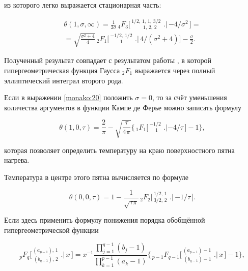 из  которого легко выражается стационарная часть:

\begin{multline*}

 \theta (1,\sigma,\infty)=\frac{1}{2\sigma}\,_{4}F_{3}\bigg[\,^{\displaystyle 1 / 2,\,1,\,1,\,3 / 2}_{\displaystyle \quad \quad \,\,1,\,2,\,2}\,\,\bigg.\bigg|\,{-4}/{\sigma^2}\,\bigg]=\\ =\sqrt{\frac{\sigma^2+4}{4}}\,_{2}F_{1}\bigg[\,^{\displaystyle -1 / 2,\,1 / 2}_{\displaystyle \quad \quad 1}\,\,\bigg.\bigg|\,{4}/({\sigma^2+4}) \bigg]-\frac{\sigma}{2}.

 \end{multline*}

Полученный результат совпадает с результатом работы \cite{manako:pinsker}, в которой гипергеометрическая функция Гаусса $ _{2}F_{1} $ выражается через полный эллиптический интеграл второго рода.





Если в выражении \eqref{monako:20} положить $ \sigma=0 $, то за счёт уменьшения количества аргументов в функции Кампе де Ферье  можно записать формулу

\begin{equation}

\label{monako:21}

\theta (1,0,\tau)=\frac{2}{\pi}-\sqrt{\frac{\tau}{4\pi}}\Bigg\{\,_{1}F_{1}\bigg[\,^{\displaystyle -1 / 2}_{\displaystyle \quad \, 1}\,\,\bigg.\bigg| {-4}/{\tau}\,\bigg]-1\Bigg\},

\end{equation}

которая позволяет определить температуру на краю поверхностного пятна нагрева. 

Температура в центре этого пятна вычисляется по формуле

$$

\theta (0,0,\tau)=1-\frac{1}{\sqrt{\tau\pi}}\,_{2}F_{2}\bigg[\,^{\displaystyle 1 / 2,\,1}_{\displaystyle 3 / 2,\,2}\,\,\bigg.\bigg|\, {-1}/{\tau}\,\bigg].

$$

Если здесь применить формулу понижения порядка обобщённой гипергеометрической функции \cite{manako:prud3}

$$ _{p}F_{q}\bigg[\,^{\displaystyle (a_{p-1}),\,1}_{\displaystyle \,(b_{q-1}),\,2}\,\,\bigg.\bigg|\,x\,\bigg]= x^{-1}\frac{\prod\limits_{\scriptscriptstyle j=1}^{\scriptscriptstyle q-1} (b_j-1)}{\prod\limits_{\scriptscriptstyle k=1}^{\scriptscriptstyle p-1} (a_k-1)}\Bigg\{\,_{p-1}F_{q-1}\bigg[\,^{\displaystyle (a_{p-1})-1}_{\displaystyle \,(b_{q-1})-1}\,\,\bigg.\bigg|\,x\,\bigg] -1\Bigg\},$$

